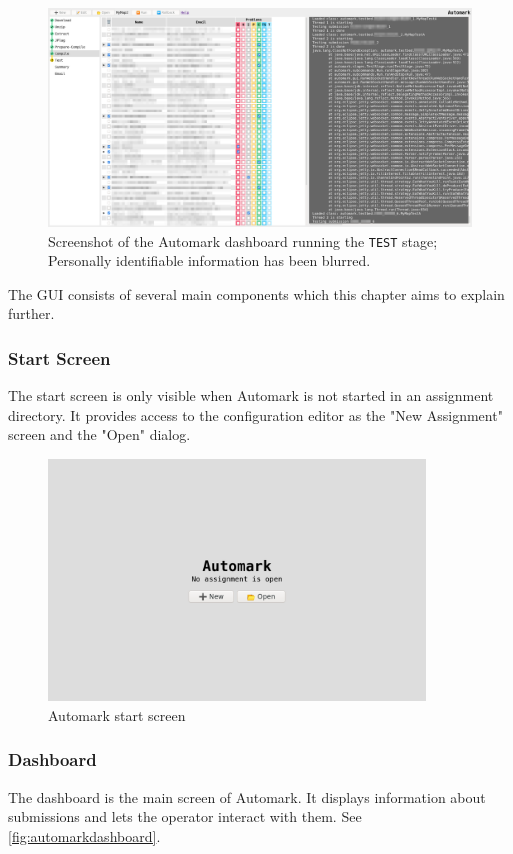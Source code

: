 \documentclass[12pt,a4paper,oneside]{report}
\begin{document}
	\begin{figure}[h]
		\includegraphics[width=\textwidth]{automark_dashboard.png}
		\vskip0pt
		\caption{Screenshot of the Automark dashboard running the \lstinline|TEST| stage; Personally identifiable information has been blurred.} \label{fig:automarkdashboard}
	\end{figure}

	The GUI consists of several main components which this chapter aims to explain further.

	\pagebreak
	\subsubsection{Start Screen}
	The start screen is only visible when Automark is not started in an assignment directory. It provides access to the configuration editor as the "New Assignment" screen and the "Open" dialog.

	\begin{figure}[H]
		\centering
		\includegraphics[width=10cm]{automark_start_screen.png}
		\caption{Automark start screen}
	\end{figure}

	\subsubsection{Dashboard}
	The dashboard is the main screen of Automark. It displays information about submissions and lets the operator interact with them. See \autoref{fig:automarkdashboard}.
\end{document}
